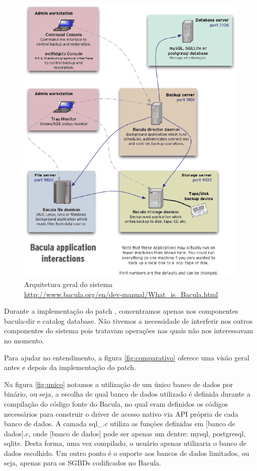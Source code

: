 \begin{figure}[h]
 \centering
 \includegraphics[scale=0.8]{../../doc/figuras/bacula-applications.eps}
 \caption[Arquitetura geral do Bacula]{Arquitetura geral do sistema \\ \url{http://www.bacula.org/en/dev-manual/What_is_Bacula.html}}
 \label{fig:arqbacula}
\end{figure}

Durante a implementação do patch \patchshort, concentramos apenas nos componentes bacula-dir e catalog database. Não tivemos a necessidade de interferir nos outros componentes do sistema pois tratavam operações nas quais não nos interessavam no momento.

Para ajudar no entendimento, a figura \ref{fig:comparativo} oferece uma visão geral  antes e depois da implementação do patch. 

Na figura \ref{fig:unico} notamos a utilização de um único banco de dados por binário, ou seja, a escolha de qual banco de dados utilizado é definida durante a compilação do código fonte do Bacula, no qual eram definidos os códigos necessários para construir o driver de acesso nativo via API própria de cada banco de dados. A camada sql\_\*.c utiliza as funções definidas em [banco de dados].c,  onde [banco de dados] pode ser apenas um dentre: mysql, postgresql, sqlite. Desta forma, uma vez compilado, o usuário apenas utilizaria o banco de dados escolhido. 
Um outro ponto é o suporte aos bancos de dados limitados, ou seja, apenas para os SGBDs codificados no Bacula.

